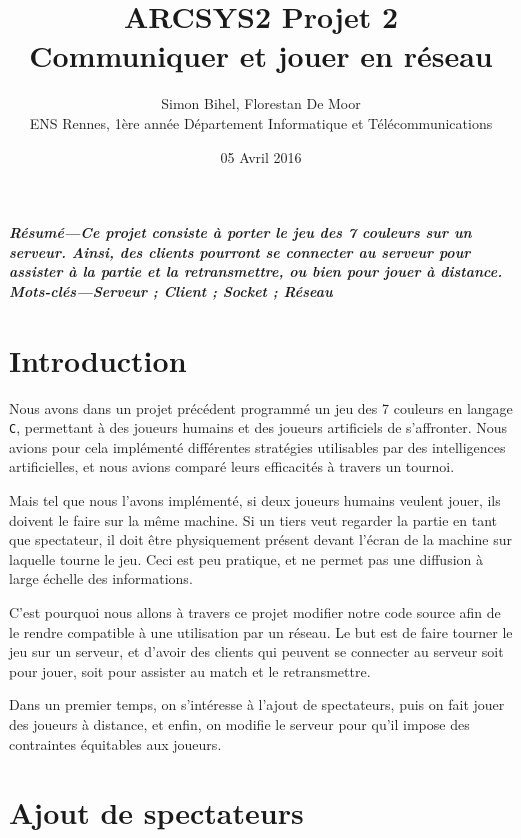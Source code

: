 \documentclass[a4paper]{article}
\providecommand{\resume}[1]{\textbf{\textit{Résumé---#1}}}
\providecommand{\keywords}[1]{\textbf{\textit{Mots-clés---#1}}}
\begin{document}
\title{ARCSYS2 Projet 2%
	\\ Communiquer et jouer en réseau}
\author{Simon Bihel, Florestan De Moor%
	 \\ ENS Rennes, 1ère année Département Informatique et Télécommunications}
\date{05 Avril 2016}

\maketitle

\resume{Ce projet consiste à porter le jeu des 7 couleurs sur un serveur. Ainsi, des clients pourront se connecter au serveur pour assister à la partie et la retransmettre, ou bien pour jouer à distance.}\\

\keywords{Serveur ; Client ; Socket ; Réseau}

\section*{Introduction}


Nous avons dans un projet précédent programmé un jeu des 7 couleurs en langage 
\texttt{C}, permettant à des joueurs humains et des joueurs artificiels de 
s'affronter. Nous avions pour cela implémenté différentes stratégies 
utilisables par des intelligences artificielles, et nous avions comparé leurs 
efficacités à travers un tournoi.

Mais tel que nous l'avons implémenté, si deux joueurs humains veulent jouer, 
ils doivent le faire sur la même machine. Si un tiers veut regarder la partie 
en tant que spectateur, il doit être physiquement présent devant l'écran de la 
machine sur laquelle tourne le jeu. Ceci est peu pratique, et ne permet pas une 
diffusion à large échelle des informations.

C'est pourquoi nous allons à travers ce projet modifier notre code source afin 
de le rendre compatible à une utilisation par un réseau. Le but est de faire 
tourner le jeu sur un serveur, et d'avoir des clients qui peuvent se connecter 
au serveur soit pour jouer, soit pour assister au match et le retransmettre.

Dans un premier temps, on s'intéresse à l'ajout de spectateurs, puis on fait jouer des joueurs à distance, et enfin, on modifie le serveur pour qu'il impose des contraintes équitables aux joueurs.

\section{Ajout de spectateurs}
\end{document}
